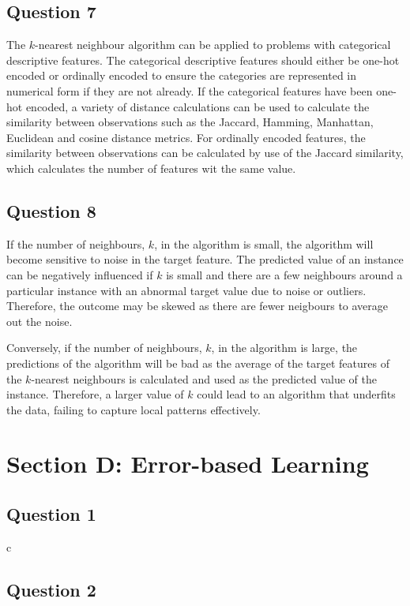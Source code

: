 \documentclass[10pt]{article}
\begin{document}
\subsection*{Question 7}

The $k$-nearest neighbour algorithm can be applied to problems with categorical descriptive features.
The categorical descriptive features should either be one-hot encoded or ordinally encoded to ensure the
categories are represented in numerical form if they are not already. If the categorical features have been
one-hot encoded, a variety of distance calculations can be used to calculate the similarity between
observations such as the Jaccard, Hamming, Manhattan, Euclidean and cosine distance metrics. For
ordinally encoded features, the similarity between observations can be calculated by use of the Jaccard
similarity, which calculates the number of features wit the same value.

\subsection*{Question 8}

If the number of neighbours, $k$, in the algorithm is small, the algorithm will become sensitive to noise in the
target feature. The predicted value of an instance can be negatively influenced if $k$ is small and there are
a few neighbours around a particular instance with an abnormal target value due to noise or outliers. Therefore,
the outcome may be skewed as there are fewer neigbours to average out the noise.

Conversely, if the number of neighbours, $k$, in the algorithm is large, the predictions of the algorithm will be bad
as the average of the target features of the $k$-nearest neighbours is calculated and used as the predicted value of the
instance. Therefore, a larger value of $k$ could lead to an algorithm that underfits the data, failing to capture local
patterns effectively.

\section*{Section D: Error-based Learning}

\subsection*{Question 1}

c

\subsection*{Question 2}
\end{document}
